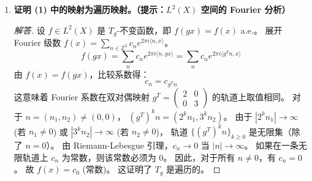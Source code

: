 \documentclass[a4paper,12pt]{article}
\newenvironment{solution}{\begin{proof}[解答]}{\end{proof}}
\begin{document}
\begin{enumerate}
\begin{solution}
        \textbf{对于 $B = \begin{pmatrix} 3 & 1 \\ 6 & 4 \end{pmatrix}$：}
        注意 $\det B = 12 - 6 = 6 \neq 0$。
        我们可以尝试分解或直接引用结论。若需利用复合性质：
        $B = \begin{pmatrix} 1 & 0 \\ 2 & 1 \end{pmatrix} \begin{pmatrix} 3 & 1 \\ 0 & 2 \end{pmatrix}$。
        第一部分 $\in SL(2, \mathbb{Z})$ 保测。
        第二部分 $\begin{pmatrix} 3 & 1 \\ 0 & 2 \end{pmatrix} = \begin{pmatrix} 1 & 1 \\ 0 & 1 \end{pmatrix} \begin{pmatrix} 3 & 0 \\ 0 & 2 \end{pmatrix}$。
        $\begin{pmatrix} 3 & 0 \\ 0 & 2 \end{pmatrix}$ 类似于 (1) 中的对角阵，保测。
        因此 $B$ 对应的映射是保测的。
    \end{solution}

    \item \textbf{证明 (1) 中的映射为遍历映射。（提示：$L^2(X)$ 空间的 Fourier 分析）}
    
    \begin{solution}
        设 $f \in L^2(X)$ 是 $T_g$-不变函数，即 $f(gx) = f(x)$ a.e.。
        展开 Fourier 级数 $f(x) = \sum_{n \in \mathbb{Z}^2} c_n e^{2\pi i \langle n, x \rangle}$。
        $$ f(gx) = \sum_{n} c_n e^{2\pi i \langle n, gx \rangle} = \sum_{n} c_n e^{2\pi i \langle g^T n, x \rangle} $$
        由 $f(x) = f(gx)$，比较系数得：
        $$ c_n = c_{g^T n} $$
        这意味着 Fourier 系数在双对偶映射 $g^T = \begin{pmatrix} 2 & 0 \\ 0 & 3 \end{pmatrix}$ 的轨道上取值相同。
        对于 $n = (n_1, n_2) \neq (0, 0)$，
        $(g^T)^k n = (2^k n_1, 3^k n_2)$。
        由于 $|2^k n_1| \to \infty$ (若 $n_1 \neq 0$) 或 $|3^k n_2| \to \infty$ (若 $n_2 \neq 0$)，
        轨道 $\{(g^T)^k n\}_{k \ge 0}$ 是无限集（除了 $n=0$）。
        由 Riemann-Lebesgue 引理，$c_n \to 0$ 当 $|n| \to \infty$。
        如果在一条无限轨道上 $c_n$ 为常数，则该常数必须为 0。
        因此，对于所有 $n \neq 0$，有 $c_n = 0$。
        故 $f(x) = c_0$ (常数)。
        这证明了 $T_g$ 是遍历的。
    \end{solution}
\end{enumerate}
\end{document}
